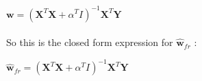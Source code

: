\documentclass[a4paper,11pt]{article}
\begin{document}
\begin{mlsolution}
\begin{math}
\textbf{w} = \left ( \textbf{X}^{T}\textbf{X} + \alpha^{T}I \right )^{-1} \textbf{X}^{T}\textbf{Y}
\end{math}\\
\\So this is the closed form expression for \begin{math}\widehat{\textbf{w}}_{fr}\end{math} :

\begin{math}
\widehat{\textbf{w}}_{fr} = \left ( \textbf{X}^{T}\textbf{X} + \alpha^{T}I \right )^{-1} \textbf{X}^{T}\textbf{Y}
\end{math}\\

\end{mlsolution}
\end{document}
